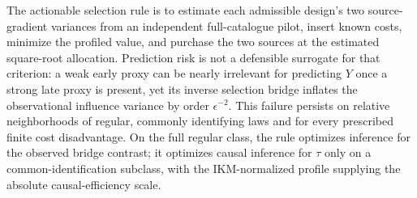 The actionable selection rule is to estimate each admissible design's two source-gradient variances from an independent full-catalogue pilot, insert known costs, minimize the profiled value, and purchase the two sources at the estimated square-root allocation. Prediction risk is not a defensible surrogate for that criterion: a weak early proxy can be nearly irrelevant for predicting \(Y\) once a strong late proxy is present, yet its inverse selection bridge inflates the observational influence variance by order \(\epsilon^{-2}\). This failure persists on relative neighborhoods of regular, commonly identifying laws and for every prescribed finite cost disadvantage. On the full regular class, the rule optimizes inference for the observed bridge contrast; it optimizes causal inference for \(\tau\) only on a common-identification subclass, with the IKM-normalized profile supplying the absolute causal-efficiency scale.